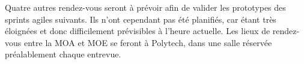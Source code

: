 \documentclass[12pt,titlepage]{report}
\begin{document}
\begin{justify}
Quatre autres rendez-vous seront à prévoir afin de valider les prototypes des sprints agiles suivants. Ils n’ont cependant pas été planifiés, car étant très éloignées et donc difficilement prévisibles à l’heure actuelle. Les lieux de rendez-vous entre la MOA et MOE se feront à Polytech, dans une salle réservée préalablement chaque entrevue. \\

\end{justify}\par
\end{document}
